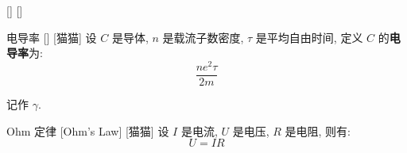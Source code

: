 \documentclass[UTF8]{ctexart}
\begin{document}
        \begin{dfn}
            []
            {}
            []
            []
        \end{dfn}
        
        \begin{dfn}
            []
            {电导率}
            []
            [猫猫]
            设 \(C\) 是导体, \(n\) 是载流子数密度, \(\tau\) 是平均自由时间, 定义 \(C\) 的\textbf{电导率}为: 
            \[\frac{ne^2\tau}{2m}\]

            记作 \(\gamma\). 
        \end{dfn}
        
        \begin{thm}
            []
            {Ohm 定律}
            [Ohm's Law]
            [猫猫]
            设 \(I\) 是电流, \(U\) 是电压, \(R\) 是电阻, 则有: 
            \[U=IR\]
        \end{thm}

        
\end{document}
